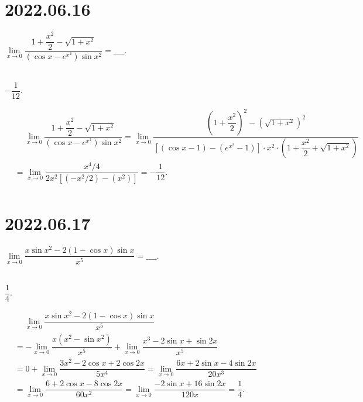 \documentclass[lang=cn,12pt]{elegantbook}
\begin{document}
\newpage

\section*{2022.06.16}

$\lim\limits_{x \to 0} \dfrac{1+\dfrac{x^2}{2} - \sqrt{1+x^2}}{(\cos x - e^{x^2})\sin x^2} = \_\_\_\_.$
\\ \\

\begin{solution}
  $-\dfrac{1}{12}.$

  $\begin{aligned}
  &\quad\  \lim\limits_{x \to 0} \dfrac{1+\dfrac{x^2}{2} - \sqrt{1+x^2}}{(\cos x - e^{x^2})\sin x^2}
  = \lim\limits_{x\to 0} \dfrac{\left(1+\dfrac{x^2}{2}\right)^2-\left(\sqrt{1+x^2}\right)^2}{
    \left[(\cos x - 1) -\left(e^{x^2} - 1\right)\right] \cdot x^2 
    \cdot \left(1+\dfrac{x^2}{2}+\sqrt{1+x^2}\right)
  }\\
  &= \lim\limits_{x\to 0} \dfrac{x^4/4}{
    2x^2 \left[\left(-x^2/2\right) -\left(x^2\right)\right]
  } = -\dfrac{1}{12}.\\
  \end{aligned}
  $
\end{solution}

\section*{2022.06.17}

$\lim\limits_{x \to 0} \dfrac{
  x\sin x^2 - 2(1-\cos x)\sin x}{x^5} = \_\_\_\_.$
\\ \\

\begin{solution}
  $\dfrac{1}{4}.$

  $\begin{aligned}
  &\quad\  \lim\limits_{x \to 0} \dfrac{
    x\sin x^2 - 2(1-\cos x)\sin x}{x^5} \\
  &= -\lim\limits_{x \to 0} \dfrac{
    x(x^2-\sin x^2)}{x^5} + 
    \lim\limits_{x \to 0} \dfrac{
    x^3-2\sin x + \sin 2x}{x^5} \\
  &= 0 + 
  \lim\limits_{x \to 0} \dfrac{
  3x^2-2\cos x + 2\cos 2x}{5x^4} 
  = 
  \lim\limits_{x \to 0} \dfrac{
  6x + 2\sin x - 4\sin 2x}{20x^3} \\
  &= 
  \lim\limits_{x \to 0} \dfrac{
  6 + 2\cos x - 8\cos 2x}{60x^2}
  = \lim\limits_{x \to 0} \dfrac{
  -2\sin x + 16\sin 2x}{120x}
  = \dfrac{1}{4}.\\
  \end{aligned}
  $
\end{solution}
\end{document}
